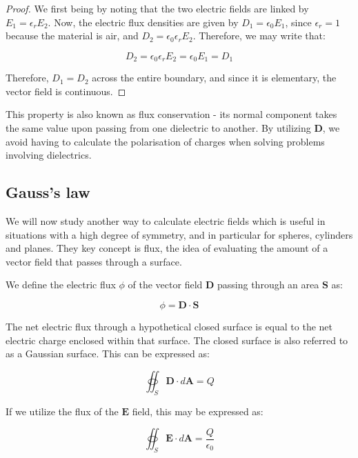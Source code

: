 \documentclass{article}
\begin{document}
\begin{proof}
    We first being by noting that the two electric fields are linked by $E_1 = \epsilon_rE_2$. Now, the electric flux densities are given by $D_1 = \epsilon_0E_1$, since $\epsilon_r = 1$ because the material is air, and $D_2 = \epsilon_0\epsilon_rE_2$. Therefore, we may write that:

    \[ D_2 = \epsilon_0\epsilon_rE_2 = \epsilon_0E_1 = D_1 \]

    Therefore, $D_1 = D_2$ across the entire boundary, and since it is elementary, the vector field is continuous.
\end{proof}

This property is also known as flux conservation - its normal component takes the same value upon passing from one dielectric to another. By utilizing $\mathbf{D}$, we avoid having to calculate the polarisation of charges when solving problems involving dielectrics.

\newpage

\subsection{Gauss's law}

We will now study another way to calculate electric fields which is useful in situations with a high degree of symmetry, and in particular for spheres, cylinders and planes. They key concept is flux, the idea of evaluating the amount of a vector field that passes through a surface. 

\begin{definition}[Flux]
    We define the electric flux $\phi$ of the vector field $\mathbf{D}$ passing through an area $\mathbf{S}$ as:

    \[ \phi = \mathbf{D} \cdot \mathbf{S} \]
\end{definition}

\begin{theorem}
    The net electric flux through a hypothetical closed surface is equal to the net electric charge enclosed within that surface. The closed surface is also referred to as a Gaussian surface. This can be expressed as:

    \[  \oiint_S \mathbf{D}\cdot d\mathbf{A} = Q \]

    If we utilize the flux of the $\mathbf{E}$ field, this may be expressed as:

    \[ \oiint_S \mathbf{E} \cdot d\mathbf{A} = \frac{Q}{\epsilon_0} \]
\end{theorem}
\end{document}
